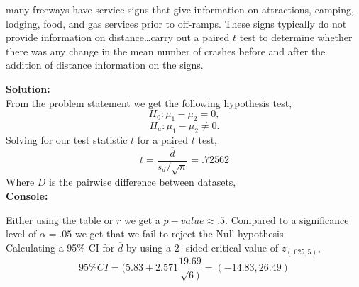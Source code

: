 \documentclass[12pt]{article}
\makeatletter
\theoremstyle{homework}
\newenvironment{exercise}[1]
{\def\@currentlabel{#1}\exercisecore}
{\endexercisecore}
\newcommand{\localhead}[1]{\par\smallskip\noindent\textbf{#1}\nobreak\\}%
\newcommand\solution{\localhead{Solution:}}
\makeatother
\begin{document}
\begin{exercise}{9.42}  many freeways have service signs that give information on attractions, camping, lodging, food,
   and gas services prior to off-ramps. These signs typically do not provide information on distance\dots carry out a 
   paired $t$ test to determine whether there was any change in the mean number of crashes before and after the addition of
   distance information on the signs.\\

   \solution From the problem statement we get the following hypothesis test,
   \begin{equation*}
    H_0:\mu_1 - \mu_2 = 0,
  \end{equation*}
  \begin{equation*}
    H_a:\mu_1 - \mu_2 \neq 0.
  \end{equation*}
  Solving for our test statistic $t$ for a paired $t$ test,
  \begin{equation*}
    t = \dfrac{\overline{d}}{s_d/\sqrt{n}} = .72562
  \end{equation*}
  Where $D$ is the pairwise difference between datasets,\\
  \textbf{Console:}
  \begin{center}
  
  \end{center}
  Either using the table or $r$ we get a $p - value \approx .5$. Compared to a significance level of 
  $\alpha = .05$ we get that we fail to reject the Null hypothesis.\\
  Calculating a 95\% CI for $\overline{d}$ by using a $2$- sided critical value of $z_{(.025,5)}$,
  \begin{equation*}
    95\% CI = (5.83 \pm 2.571 \frac{19.69}{\sqrt{6})} = (-14.83,26.49)
  \end{equation*}

\end{exercise}
\vspace{.5in}
\end{document}
